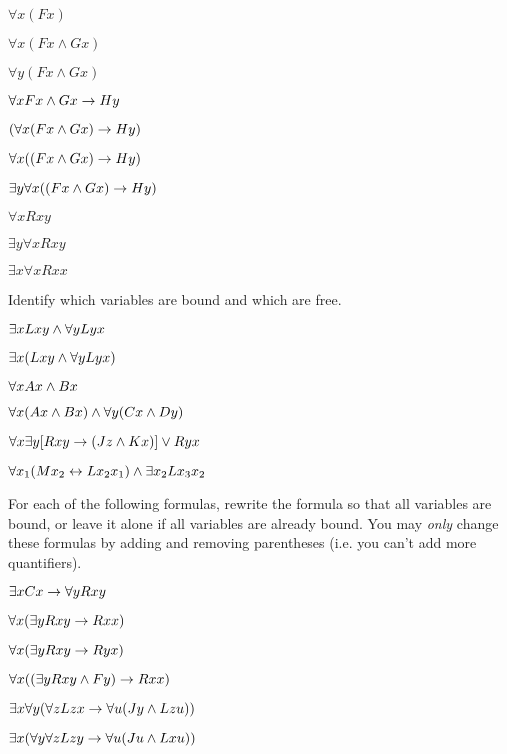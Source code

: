 \begin{earg}
\item $\forall x(Fx)$
\item $\forall x(Fx \land Gx)$
\item $\forall y(Fx \land Gx)$
\item $\forall xFx \wedge Gx \rightarrow Hy$
\item $(\forall x(Fx \wedge Gx) \rightarrow Hy)$
\item $\forall x((Fx \wedge Gx) \rightarrow Hy)$
\item $\exists y \forall x((Fx \wedge Gx) \rightarrow Hy)$
\item $\forall xRxy$
\item $\exists y \forall xRxy$
\item $\exists x \forall xRxx$
\end{earg}


\problempart
\label{pr.freeFOL}
Identify which variables are bound and which are free.
\begin{earg}
\item $\exists x Lxy \wedge \forall y Lyx$
\item $\exists x (Lxy \wedge \forall y Lyx)$
\item $\forall x Ax \wedge Bx$
\item $\forall x (Ax \wedge Bx) \wedge \forall y(Cx \wedge Dy)$
\item $\forall x\exists y[Rxy \rightarrow (Jz \wedge Kx)] \vee Ryx$
\item $\forall x_1(Mx_2 \leftrightarrow Lx_2x_1) \wedge \exists x_2 Lx_3x_2$
\end{earg}

\problempart
For each of the following formulas, rewrite the formula so that all variables are bound, or leave it alone if all variables are already bound.  You may \emph{only} change these formulas by adding and removing parentheses (i.e. you can't add more quantifiers).

\begin{earg}
\item $\exists xCx \rightarrow \forall yRxy$
\item $\forall x(\exists yRxy \rightarrow Rxx)$
\item $\forall x(\exists yRxy \rightarrow Ryx)$
\item $\forall x((\exists yRxy \wedge Fy) \rightarrow Rxx)$
\item $\exists x\forall y(\forall zLzx \rightarrow \forall u(Jy \wedge Lzu))$
\item $\exists x(\forall y \forall zLzy \rightarrow \forall u(Ju \wedge Lxu))$
\end{earg}